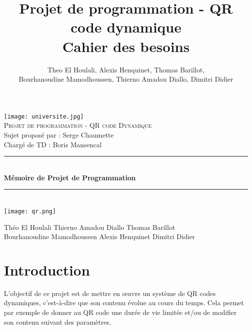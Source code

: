 \documentclass[a4paper,12pt]{article}
\title{Projet de programmation - QR code dynamique\\Cahier des besoins}
\author{Theo El Houlali, Alexis Henquinet, Thomas Barillot,\\Bourhanoudine Mamodhoussen, Thierno Amadou Diallo, Dimitri Didier
}
\begin{document}
\begin{titlepage}
  \begin{sffamily}
  \begin{center}
	\texttt{[image: universite.jpg]}~\\[1cm]

    \textsc{\Large Projet de programmation - QR code Dynamique }\\[1.5cm]
    Sujet proposé par : Serge Chaumette\\
    Chargé de TD : Boris Mansencal

    \rule{1\linewidth}{2pt}
     \\[1cm]
    { \huge \bfseries Mémoire de Projet de Programmation\\[1cm] }
    \rule{1\linewidth}{2pt}
    \\[3cm]
    \texttt{[image: qr.png]}
    \\[1cm]

   \vfill
      \begin{center}
        Théo El Houlali \hspace*{3.1cm} Thierno Amadou Diallo \hspace*{1.1cm} Thomas Barillot\\
        Bourhanoudine Mamodhoussen \hspace*{1cm} Alexis Henquinet \hspace*{2cm} Dimitri Didier
      \end{center}
 
 
  \end{center}
  \end{sffamily}
\end{titlepage}

\newpage

\tableofcontents
\newpage


\section{Introduction}


\noindent L'objectif de ce projet est de mettre en œuvre un système de QR codes dynamiques, c'est-à-dire que son contenu évolue au cours du temps. Cela permet par exemple de donner au QR code une durée de vie limitée et/ou de modifier son contenu suivant des paramètres.\\
\end{document}

